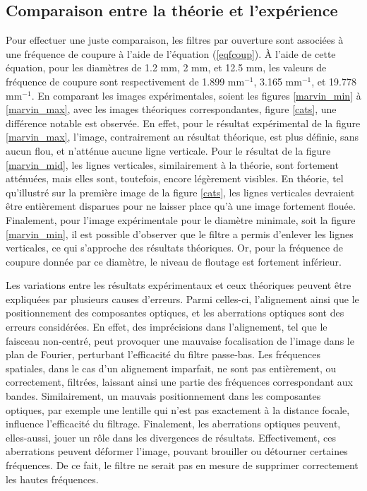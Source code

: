 \documentclass[11pt,letterpaper]{article}
\begin{document}
\subsection{Comparaison entre la théorie et l'expérience}\label{comptheoexp}
Pour effectuer une juste comparaison, les filtres par ouverture sont associées à une fréquence de coupure à l'aide de l'équation (\ref{eqfcoup}). À l'aide de cette équation, pour les diamètres de 1.2 mm, 2 mm, et 12.5 mm, les valeurs de fréquence de coupure sont respectivement de 1.899 mm$^{-1}$, 3.165 mm$^{-1}$, et 19.778 mm$^{-1}$. En comparant les images expérimentales, soient les figures \ref{marvin_min} à \ref{marvin_max}, avec les images théoriques correspondantes, figure \ref{cats}, une différence notable est observée. En effet, pour le résultat expérimental de la figure \ref{marvin_max}, l'image, contrairement au résultat théorique, est plus définie, sans aucun flou, et n'atténue aucune ligne verticale. Pour le résultat de la figure \ref{marvin_mid}, les lignes verticales, similairement à la théorie, sont fortement atténuées, mais elles sont, toutefois, encore légèrement visibles. En théorie, tel qu'illustré sur la première image de la figure \ref{cats}, les lignes verticales devraient être entièrement disparues pour ne laisser place qu'à une image fortement flouée. Finalement, pour l'image expérimentale pour le diamètre minimale, soit la figure \ref{marvin_min}, il est possible d'observer que le filtre a permis d'enlever les lignes verticales, ce qui s'approche des résultats théoriques. Or, pour la fréquence de coupure donnée par ce diamètre, le niveau de floutage est fortement inférieur.

Les variations entre les résultats expérimentaux et ceux théoriques peuvent être expliquées par plusieurs causes d'erreurs. Parmi celles-ci, l'alignement ainsi que le positionnement des composantes optiques, et les aberrations optiques sont des erreurs considérées. En effet, des imprécisions dans l'alignement, tel que le faisceau non-centré, peut provoquer une mauvaise focalisation de l'image dans le plan de Fourier, perturbant l'efficacité du filtre passe-bas. Les fréquences spatiales, dans le cas d'un alignement imparfait, ne sont pas entièrement, ou correctement, filtrées, laissant ainsi une partie des fréquences correspondant aux bandes. Similairement, un mauvais positionnement dans les composantes optiques, par exemple une lentille qui n'est pas exactement à la distance focale, influence l'efficacité du filtrage. Finalement, les aberrations optiques peuvent, elles-aussi, jouer un rôle dans les divergences de résultats. Effectivement, ces aberrations peuvent déformer l'image, pouvant brouiller ou détourner certaines fréquences. De ce fait, le filtre ne serait pas en mesure de supprimer correctement les hautes fréquences.
\end{document}
